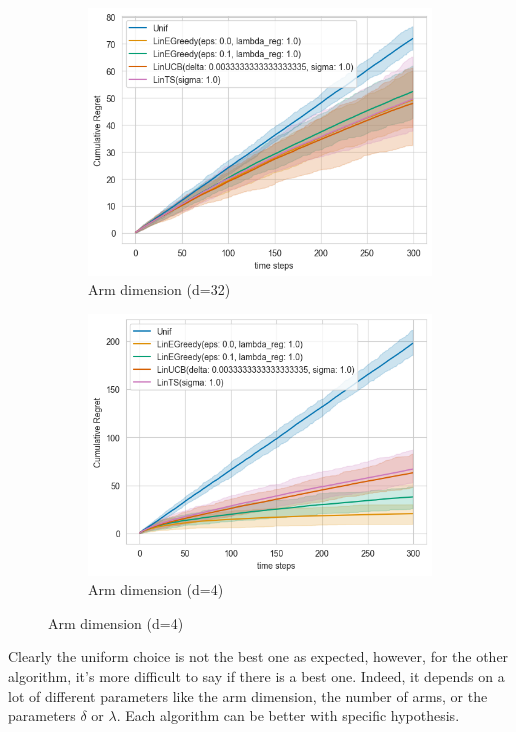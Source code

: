\begin{itemize}
\begin{figure}[h]
      \centering
      \begin{subfigure}[b]{0.48\textwidth}
          \centering
          \includegraphics[width=\textwidth]{plots/output.png}
          \caption{Arm dimension (d=32)}
      \end{subfigure}
      \hfill
      \begin{subfigure}[b]{0.48\textwidth}
          \centering
          \includegraphics[width=\textwidth]{plots/output1.png}
          \caption{Arm dimension (d=4)}
      \end{subfigure}
\end{figure}

Clearly the uniform choice is not the best one as expected, however, for the other algorithm, it's more difficult to say if there is a best one. Indeed, it depends on a lot of different parameters like the arm dimension, the number of arms, or the parameters $\delta$ or $\lambda$. Each algorithm can be better with specific hypothesis.

\end{itemize}



